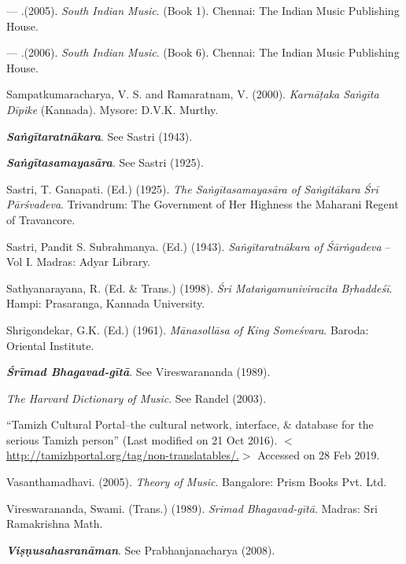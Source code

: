 \begin{thebibliography}{99}
  — .(2005). \textit{South Indian Music}. (Book 1). Chennai: The Indian Music Publishing House.

  — .(2006). \textit{South Indian Music}. (Book 6). Chennai: The Indian Music Publishing House.

  Sampatkumaracharya, V. S. and Ramaratnam, V. (2000). \textit{Karnāṭaka Saṅgīta Dīpike} (Kannada). Mysore: D.V.K. Murthy.

  \textbf{\textit{Saṅgītaratnākara}}. See Sastri (1943).

  \textbf{\textit{Saṅgītasamayasāra}}. See Sastri (1925).

  Sastri, T. Ganapati. (Ed.) (1925). \textit{The Saṅgītasamayasāra of Saṅgitākara Śrī Pārśvadeva}. Trivandrum: The Government of Her Highness the Maharani Regent of Travancore. 

  Sastri, Pandit S. Subrahmanya. (Ed.) (1943). \textit{Saṅgītaratnākara of Śārṅgadeva} – Vol I. Madras: Adyar Library.

  Sathyanarayana, R. (Ed. \& Trans.) (1998). \textit{Śri Mataṅgamuniviracita Bṛhaddeśī}. Hampi: Prasaranga, Kannada University.

  Shrigondekar, G.K. (Ed.) (1961). \textit{Mānasollāsa of King Someśvara}. Baroda: Oriental Institute.

  \textbf{\textit{Śrīmad Bhagavad-gītā}}. See Vireswarananda (1989).

  \textit{The Harvard Dictionary of Music}. See Randel (2003).

  “Tamizh Cultural Portal–the cultural network, interface, \& database for the serious Tamizh person” (Last modified on 21 Oct 2016). $<$\url{http://tamizhportal.org/tag/non-translatables/.}$>$ Accessed on 28 Feb 2019.

  Vasanthamadhavi. (2005). \textit{Theory of Music}. Bangalore: Prism Books Pvt. Ltd.

  Vireswarananda, Swami. (Trans.) (1989). \textit{Srimad Bhagavad-gītā}. Madras: Sri Ramakrishna Math.

  \textbf{\textit{Viṣṇusahasranāman}}. See Prabhanjanacharya (2008).

 \end{thebibliography}

